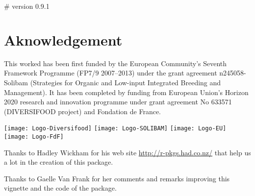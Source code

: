 # version 0.9.1
\section*{Aknowledgement} 
This worked has been first funded by the European Community’s Seventh Framework Programme (FP7/9 2007–2013) under the grant agreement n245058-Solibam (Strategies for Organic and Low-input Integrated Breeding and Management).
It has been completed by funding from European Union’s Horizon 2020 research and innovation programme under grant agreement No 633571 (DIVERSIFOOD project) and Fondation de France.


\begin{center}
\texttt{[image: Logo-Diversifood]} \hspace{.5cm}
\texttt{[image: Logo-SOLIBAM]} \hspace{.5cm}
\texttt{[image: Logo-EU]} \hspace{.5cm}
\texttt{[image: Logo-FdF]}
\end{center}

Thanks to Hadley Wickham for his web site \url{http://r-pkgs.had.co.nz/} that help us a lot in the creation of this package.

Thanks to Gaelle Van Frank for her comments and remarks improving this vignette and the code of the package.



